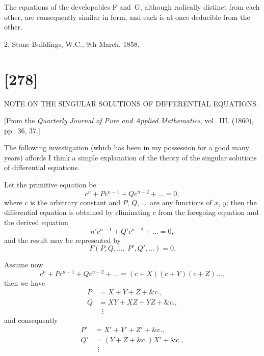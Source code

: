 \documentclass[11pt,a4paper]{book}
\begin{document}
The equations of the developables F and~G, although radically distinct from each
other, are consequently similar in form, and each is at once deducible from the other.

\begin{flushright}
2, Stone Buildings, W.C., 9th March, 1858.
\end{flushright}


\newpage
\section*{[278]}
\begin{center}
{\large NOTE ON THE SINGULAR SOLUTIONS OF DIFFERENTIAL EQUATIONS.}
\end{center}

[From the \textit{Quarterly Journal of Pure and Applied Mathematics}, vol.~III. (1860),
pp.~36, 37.]

The following investigation (which has been in my possession for a good many
years) affords I think a simple explanation of the theory of the singular solutions of
differential equations.

Let the primitive equation be
\[
c^{n} + Pc^{n-1} + Qc^{n-2} + \ldots = 0,
\]
where $c$ is the arbitrary constant and $P$, $Q$, \ldots\ are any functions of $x$, $y$; then the
differential equation is obtained by eliminating $c$ from the foregoing equation and the
derived equation
\[
n'c^{n-1} + Q'c^{n-2} + \ldots = 0,
\]
and the result may be represented by
\[
F(P, Q, \ldots,\ P', Q', \ldots) = 0.
\]

Assume now
\[
c^{n} + Pc^{n-1} + Qc^{n-2} + \ldots = (c + X)(c + Y)(c + Z)\ldots,
\]
then we have
\begin{align*}
P &= X + Y + Z + \&\mathrm{c}.,\\
Q &= XY + XZ + YZ + \&\mathrm{c}.,\\
&\ \;\vdots
\end{align*}
and consequently
\begin{align*}
P' &= X' + Y' + Z' + \&\mathrm{c}.,\\
Q' &= (Y + Z + \&\mathrm{c}.)X' + \&\mathrm{c}.,\\
&\ \;\vdots
\end{align*}
\end{document}
